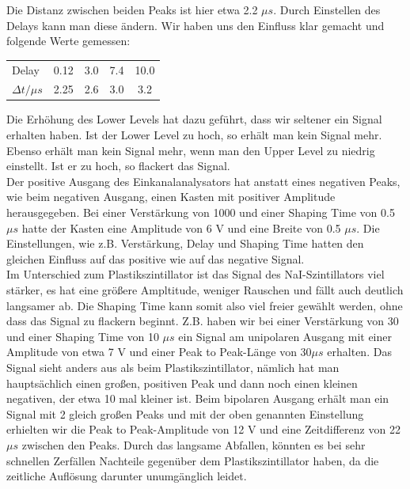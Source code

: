 Die Distanz zwischen beiden Peaks ist hier etwa 2.2 $\mu s$. Durch Einstellen des Delays kann man diese ändern. Wir haben uns den Einfluss klar gemacht und folgende Werte gemessen:\\

\begin{center}
\begin{tabular}{l c c c c}
Delay & 0.12 & 3.0 & 7.4 & 10.0\\
$\Delta t / \mu s$ & 2.25 & 2.6 & 3.0 & 3.2
\end{tabular}
\end{center}

Die Erhöhung des Lower Levels hat dazu geführt, dass wir seltener ein Signal erhalten haben. Ist der Lower Level zu hoch, so erhält man kein Signal mehr. Ebenso erhält man kein Signal mehr, wenn man den Upper Level zu niedrig einstellt. Ist er zu hoch, so flackert das Signal.\\

Der positive Ausgang des Einkanalanalysators hat anstatt eines negativen Peaks, wie beim negativen Ausgang, einen Kasten mit positiver Amplitude herausgegeben. Bei einer Verstärkung von 1000 und einer Shaping Time von 0.5 $\mu s$ hatte der Kasten eine Amplitude von 6 V und eine Breite von 0.5 $\mu s$. Die Einstellungen, wie z.B. Verstärkung, Delay und Shaping Time hatten den gleichen Einfluss auf das positive wie auf das negative Signal.\\ %

Im Unterschied zum Plastikszintillator ist das Signal des NaI-Szintillators viel stärker, es hat eine größere Ampltitude, weniger Rauschen und fällt auch deutlich langsamer ab. Die Shaping Time kann somit also viel freier gewählt werden, ohne dass das Signal zu flackern beginnt. Z.B. haben wir bei einer Verstärkung von 30 und einer Shaping Time von 10 $\mu s$ ein Signal am unipolaren Ausgang mit einer Amplitude von etwa 7 V und einer Peak to Peak-Länge von 30$\mu s$ erhalten. Das Signal sieht anders aus als beim Plastikszintillator, nämlich hat man hauptsächlich einen großen, positiven Peak und dann noch einen kleinen negativen, der etwa 10 mal kleiner ist. Beim bipolaren Ausgang erhält man ein Signal mit 2 gleich großen Peaks und mit der oben genannten Einstellung erhielten wir die Peak to Peak-Amplitude von 12 V und eine Zeitdifferenz von 22 $\mu s$ zwischen den Peaks. Durch das langsame Abfallen, könnten es bei sehr schnellen Zerfällen Nachteile gegenüber dem Plastikszintillator haben, da die zeitliche Auflösung darunter unumgänglich leidet. 

